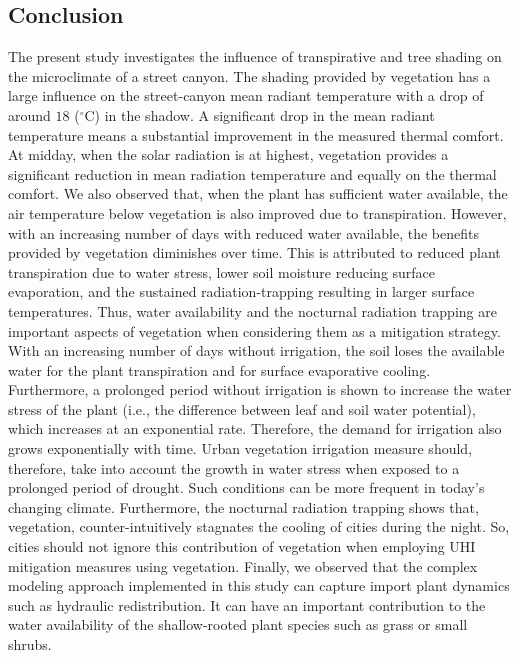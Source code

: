 
\subsection{Conclusion}

The present study investigates the influence of transpirative and tree shading on the microclimate of a street canyon. The shading provided by vegetation has a large influence on the street-canyon mean radiant temperature with a drop of around $18$ ($^{\circ}$C) in the shadow. A significant drop in the mean radiant temperature means a substantial improvement in the measured thermal comfort. At midday, when the solar radiation is at highest, vegetation provides a significant reduction in mean radiation temperature and equally on the thermal comfort. We also observed that, when the plant has sufficient water available, the air temperature below vegetation is also improved due to transpiration. However, with an increasing number of days with reduced water available, the benefits provided by vegetation diminishes over time. This is attributed to reduced plant transpiration due to water stress, lower soil moisture reducing surface evaporation, and the sustained radiation-trapping resulting in larger surface temperatures. Thus, water availability and the nocturnal radiation trapping are important aspects of vegetation when considering them as a mitigation strategy. With an increasing number of days without irrigation, the soil loses the available water for the plant transpiration and for surface evaporative cooling. Furthermore, a prolonged period without irrigation is shown to increase the water stress of the plant (i.e., the difference between leaf and soil water potential), which increases at an exponential rate. Therefore, the demand for irrigation also grows exponentially with time. Urban vegetation irrigation measure should, therefore, take into account the growth in water stress when exposed to a prolonged period of drought. Such conditions can be more frequent in today's changing climate. Furthermore, the nocturnal radiation trapping shows that, vegetation, counter-intuitively stagnates the cooling of cities during the night. So, cities should not ignore this contribution of vegetation when employing UHI mitigation measures using vegetation. Finally, we observed that the complex modeling approach implemented in this study can capture import plant dynamics such as hydraulic redistribution. It can have an important contribution to the water availability of the shallow-rooted plant species such as grass or small shrubs.

